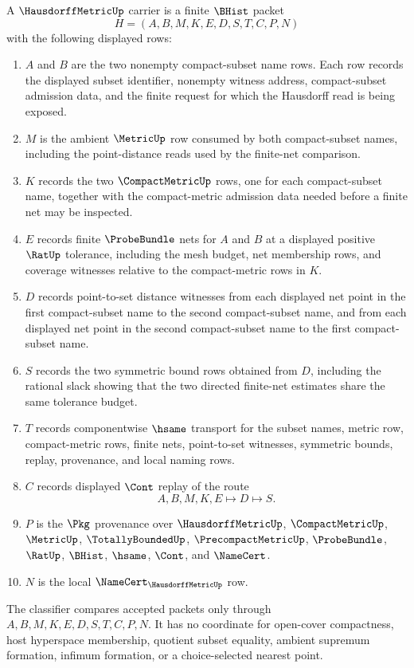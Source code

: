 \begin{definition}
\label{def:hausdorff-metric-finite-net-carrier}
A $\HausdorffMetricUp$ carrier is a finite $\BHist$ packet
$$
H=(A,B,M,K,E,D,S,T,C,P,N)
$$
with the following displayed rows:
\begin{enumerate}
\item $A$ and $B$ are the two nonempty compact-subset name rows. Each row records the displayed subset identifier, nonempty witness address, compact-subset admission data, and the finite request for which the Hausdorff read is being exposed.
\item $M$ is the ambient $\MetricUp$ row consumed by both compact-subset names, including the point-distance reads used by the finite-net comparison.
\item $K$ records the two $\CompactMetricUp$ rows, one for each compact-subset name, together with the compact-metric admission data needed before a finite net may be inspected.
\item $E$ records finite $\ProbeBundle$ nets for $A$ and $B$ at a displayed positive $\RatUp$ tolerance, including the mesh budget, net membership rows, and coverage witnesses relative to the compact-metric rows in $K$.
\item $D$ records point-to-set distance witnesses from each displayed net point in the first compact-subset name to the second compact-subset name, and from each displayed net point in the second compact-subset name to the first compact-subset name.
\item $S$ records the two symmetric bound rows obtained from $D$, including the rational slack showing that the two directed finite-net estimates share the same tolerance budget.
\item $T$ records componentwise $\hsame$ transport for the subset names, metric row, compact-metric rows, finite nets, point-to-set witnesses, symmetric bounds, replay, provenance, and local naming rows.
\item $C$ records displayed $\Cont$ replay of the route
$$
A,B,M,K,E \longmapsto D \longmapsto S .
$$
\item $P$ is the $\Pkg$ provenance over $\HausdorffMetricUp$, $\CompactMetricUp$, $\MetricUp$, $\TotallyBoundedUp$, $\PrecompactMetricUp$, $\ProbeBundle$, $\RatUp$, $\BHist$, $\hsame$, $\Cont$, and $\NameCert$.
\item $N$ is the local $\NameCert_{\HausdorffMetricUp}$ row.
\end{enumerate}
The classifier compares accepted packets only through $A,B,M,K,E,D,S,T,C,P,N$. It has no coordinate for open-cover compactness, host hyperspace membership, quotient subset equality, ambient supremum formation, infimum formation, or a choice-selected nearest point.
\end{definition}

